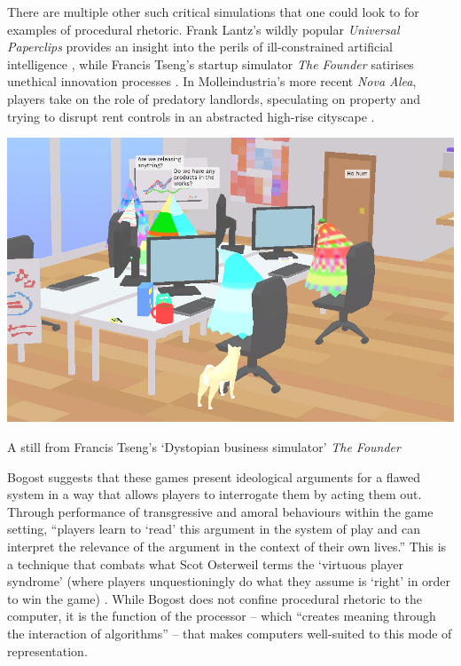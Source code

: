 \documentclass[nofonts,nols,justified,nobib]{tufte-book}
\begin{document}
There are multiple other such critical simulations that one could look to for examples of procedural rhetoric. Frank Lantz's wildly popular \emph{Universal Paperclips} provides an insight into the perils of ill-constrained artificial intelligence \cite{lantz_universal_2017}, while Francis Tseng's startup simulator \emph{The Founder} satirises unethical innovation processes \cite{tseng_founder_2017}. In Molleindustria's more recent \emph{Nova Alea}, players take on the role of predatory landlords, speculating on property and trying to disrupt rent controls in an abstracted high-rise cityscape \cite{molleindustria_nova_2016}.

\begin{marginfigure}
\includegraphics[width=\textwidth]{img/1/the-founder.jpg}
\caption{A still from Francis Tseng's `Dystopian business simulator' \emph{The Founder} \cite{tseng_founder_2017-1}}
\end{marginfigure}

Bogost suggests that these games present ideological arguments for a flawed system in a way that allows players to interrogate them by acting them out. Through performance of transgressive and amoral behaviours within the game setting, ``players learn to `read' this argument in the system of play and can interpret the relevance of the argument in the context of their own lives.''\cite{bogost_rhetoric_2008} This is a technique that combats what Scot Osterweil terms the `virtuous player syndrome' (where players unquestioningly do what they assume is `right' in order to win the game) \cite{osterweil_civic_2011}. While Bogost does not confine procedural rhetoric to the computer, it is the function of the processor -- which ``creates meaning through the interaction of algorithms'' -- that makes computers well-suited to this mode of representation.
\end{document}
